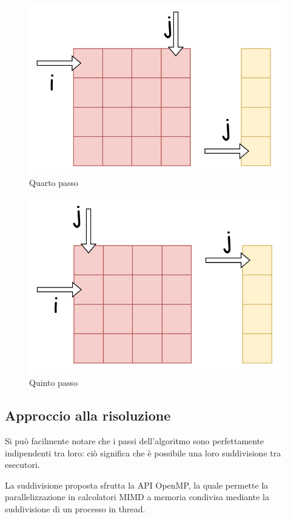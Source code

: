 \begin{figure}[h]
    \centering
    \includegraphics[width=0.4\linewidth]{QuartaItr.png}
    \caption{Quarto passo}
    \label{fig:enter-label}    
\end{figure}
\begin{figure}[h]
    \centering
    \includegraphics[width=0.4\linewidth]{QuintaItr.png}
    \caption{Quinto passo}
    \label{fig:enter-label}    
\end{figure}


\subsection{Approccio alla risoluzione}
Si può facilmente notare che i passi dell'algoritmo sono perfettamente indipendenti tra loro: ciò significa che è possibile una loro suddivisione tra esecutori.

La suddivisione proposta sfrutta la API OpenMP, la quale permette la parallelizzazione in calcolatori MIMD a memoria condivisa mediante la suddivisione di un processo in thread.
